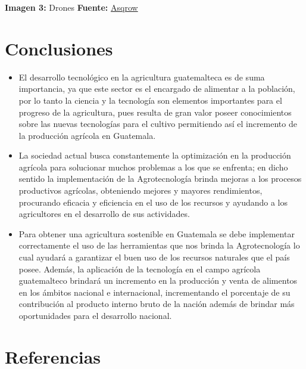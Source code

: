 \documentclass[12pt,spanish,Letterpaper,openany]{book}
\begin{document}


\textbf{Imagen 3:} Drones \textbf{Fuente:} \href{https://www.asgrow.com.mx/}{Asqrow}



\hypertarget{conclusiones-6}{%
\section*{Conclusiones}\label{conclusiones-6}}

\begin{itemize}
\item
  El desarrollo tecnológico en la agricultura guatemalteca es de suma importancia, ya que este sector es el encargado de alimentar a la población, por lo tanto la ciencia y la tecnología son elementos importantes para el progreso de la agricultura, pues resulta de gran valor poseer conocimientos sobre las nuevas tecnologías para el cultivo permitiendo así el incremento de la producción agrícola en Guatemala.
\item
  La sociedad actual busca constantemente la optimización en la producción agrícola para solucionar muchos problemas a los que se enfrenta; en dicho sentido la implementación de la Agrotecnología brinda mejoras a los procesos productivos agrícolas, obteniendo mejores y mayores rendimientos, procurando eficacia y eficiencia en el uso de los recursos y ayudando a los agricultores en el desarrollo de sus actividades.
\item
  Para obtener una agricultura sostenible en Guatemala se debe implementar correctamente el uso de las herramientas que nos brinda la Agrotecnología lo cual ayudará a garantizar el buen uso de los recursos naturales que el país posee. Además, la aplicación de la tecnología en el campo agrícola guatemalteco brindará un incremento en la producción y venta de alimentos en los ámbitos nacional e internacional, incrementando el porcentaje de su contribución al producto interno bruto de la nación además de brindar más oportunidades para el desarrollo nacional.
\end{itemize}

\hypertarget{referencias-6}{%
\section*{Referencias}\label{referencias-6}}
\end{document}
